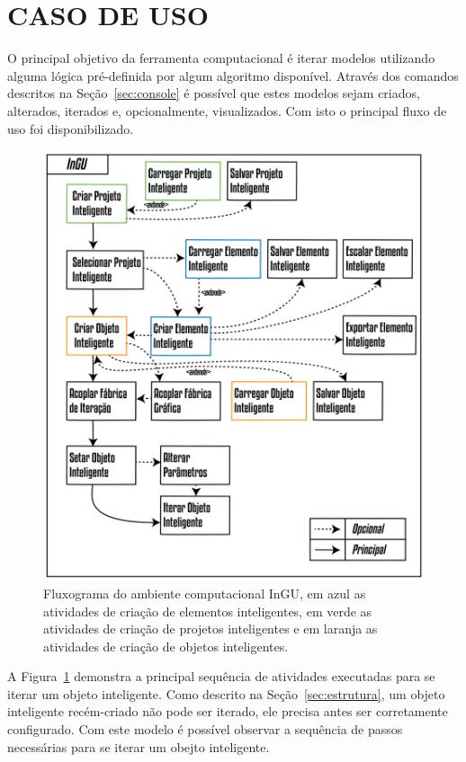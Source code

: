 \section{CASO DE USO}\label{sec:caso_de_uso}

O principal objetivo da ferramenta computacional é iterar modelos utilizando alguma lógica pré-definida por algum algoritmo disponível. Através dos comandos descritos na Seção~\ref{sec:console} é possível que estes modelos sejam criados, alterados, iterados e, opcionalmente, visualizados. Com isto o principal fluxo de uso foi disponibilizado.

\begin{figure}[!htbp]
	\centering
	\includegraphics[width=\linewidth]{Figures/CasoDeUso@16x.png}
	\caption{Fluxograma do ambiente computacional InGU, em azul as atividades de criação de elementos inteligentes, em verde as atividades de criação de projetos inteligentes e em laranja as atividades de criação de objetos inteligentes.}
	\label{fig:caso_uso}
\end{figure}

A Figura~\ref{fig:caso_uso} demonstra a principal sequência de atividades executadas para se iterar um objeto inteligente. Como descrito na Seção~\ref{sec:estrutura}, um objeto inteligente recém-criado não pode ser iterado, ele precisa antes ser corretamente configurado. Com este modelo é possível observar a sequência de passos necessárias para se iterar um obejto inteligente.

